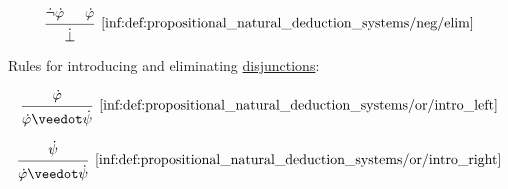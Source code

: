 \begin{definition}
\begin{thmenum}
\begin{paracol}{2}
      \begin{rightcolumn}
        \leavevmode\vfill
        \begin{equation*}\taglabel[\ensuremath{ \neg^- }]{inf:def:propositional_natural_deduction_systems/neg/elim}
          \begin{prooftree}
            \hypo{ \synneg \syn\varphi }
            \hypo{ \syn\varphi }
            \infer2[\ref{inf:def:propositional_natural_deduction_systems/neg/elim}]{ \synbot }
          \end{prooftree}
        \end{equation*}
      \end{rightcolumn}
    \end{paracol}

     Rules for introducing and eliminating \hyperref[def:propositional_alphabet/connectives/disjunction]{disjunctions}:
    \begin{paracol}{3}
      \begin{nthcolumn}{0}
        \leavevmode\vfill
        \begin{equation*}\taglabel[\ensuremath{ \vee^{+_L} }]{inf:def:propositional_natural_deduction_systems/or/intro_left}
          \begin{prooftree}
            \hypo{ \syn\varphi }
            \infer1[\ref{inf:def:propositional_natural_deduction_systems/or/intro_left}]{ \syn\varphi \synvee \syn\psi }
          \end{prooftree}
        \end{equation*}
      \end{nthcolumn}

      \begin{nthcolumn}{1}
        \leavevmode\vfill
        \begin{equation*}\taglabel[\ensuremath{ \vee^{+_R} }]{inf:def:propositional_natural_deduction_systems/or/intro_right}
          \begin{prooftree}
            \hypo{ \syn\psi }
            \infer1[\ref{inf:def:propositional_natural_deduction_systems/or/intro_right}]{ \syn\varphi \synvee \syn\psi }
          \end{prooftree}
        \end{equation*}
      \end{nthcolumn}


\end{paracol}
\end{thmenum}
\end{definition}
